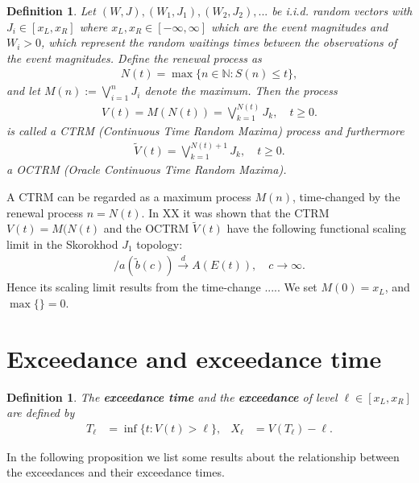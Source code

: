 \documentclass[12pt]{article}
\newtheorem{definition}[equation]{Definition}
\newcommand{\1}{\mathbf 1}
\begin{document}
\begin{definition}
Let $(W,J),(W_1,J_1),(W_2,J_2),...$ be i.i.d. random vectors with $J_i \in [x_L, x_R]$ where $x_L, x_R \in [-\infty, \infty]$ which are the event magnitudes and $W_i > 0$, which represent the random waitings times between the observations of the event magnitudes. Define the renewal process as
\begin{align} \label{eq:renewal-process}
N(t) = \max\{n \in \mathbb N: S(n) \le t\},
\end{align}
and let $M(n) := \bigvee_{i=1}^n J_i$ denote the maximum. Then the process
\begin{align}
V(t)=M(N(t)) = \bigvee_{k=1}^{N(t)} J_k, \quad t \ge 0.
\end{align}
is called a CTRM (Continuous Time Random Maxima) process and furthermore
\begin{align}
\tilde V(t) = \bigvee_{k=1}^{N(t)+1} J_k, \quad t \ge 0.
\end{align}
a OCTRM (Oracle Continuous Time Random Maxima).
\end{definition}
A CTRM can be regarded as a maximum process $M(n)$, time-changed by the
renewal process $n = N(t)$. In XX it was shown that the CTRM $V(t) = M(N(t)$ and the OCTRM $\tilde V(t)$ have the following functional scaling limit in the Skorokhod $J_1$ topology: 
\begin{align*}
[V(ct) - d(\tilde b(c))] / a(\tilde b(c)) \stackrel{d}{\to} 
A(E(t)), \quad c \to \infty.
\end{align*}
Hence its scaling limit results from the time-change .....
We set $M(0) = x_L$, and $\max\{\} = 0$. 



\section{Exceedance and exceedance time}

\begin{definition}
The \textbf{exceedance time} and the \textbf{exceedance} of level $\ell \in [x_L,x_R]$ are
defined by
\begin{align*}
T_\ell &= \inf\{t: V(t) > \ell\}, 
&
X_\ell &= V(T_\ell) - \ell .
\end{align*}
\end{definition}

In the following proposition we list some results about the relationship between the exceedances and their exceedance times.
\end{document}
